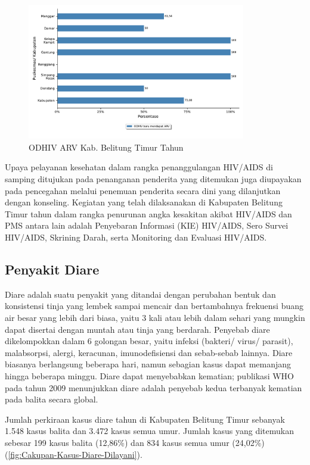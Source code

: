 \begin{figure}[H]
  \centering
  \includegraphics[width=0.85\textwidth]{bab_06/bab_06_03b_ARV}
  \caption{ODHIV ARV Kab. Belitung Timur Tahun \tP}
  \label{fig:HIV-ARV}
\end{figure}

Upaya pelayanan kesehatan dalam rangka penanggulangan HIV/AIDS di samping ditujukan pada penanganan penderita yang ditemukan juga diupayakan pada pencegahan melalui penemuan penderita secara dini yang dilanjutkan dengan konseling.
Kegiatan yang telah dilaksanakan di Kabupaten Belitung Timur tahun \tP dalam rangka penurunan angka kesakitan akibat HIV/AIDS dan PMS antara lain adalah Penyebaran Informasi (KIE) HIV/AIDS, Sero Survei HIV/AIDS, Skrining Darah, serta Monitoring dan Evaluasi HIV/AIDS.

\subsection{Penyakit Diare}
Diare adalah suatu penyakit yang ditandai dengan perubahan bentuk dan konsistensi tinja yang lembek sampai mencair dan bertambahnya frekuensi buang air besar yang lebih dari biasa, yaitu 3 kali atau lebih dalam sehari yang mungkin dapat disertai dengan muntah atau tinja yang berdarah.
Penyebab diare dikelompokkan dalam 6 golongan besar, yaitu infeksi (bakteri/ virus/ parasit), malabsorpsi, alergi, keracunan, imunodefisiensi dan sebab-sebab lainnya. Diare biasanya berlangsung beberapa hari, namun sebagian kasus dapat memanjang hingga beberapa minggu.
Diare dapat menyebabkan kematian; publikasi WHO pada tahun 2009 menunjukkan diare adalah penyebab kedua terbanyak kematian pada balita secara global.

Jumlah perkiraan kasus diare tahun \tP di Kabupaten Belitung Timur sebanyak 1.548 kasus balita dan 3.472 kasus semua umur.
Jumlah kasus yang ditemukan sebesar 199 kasus balita (12,86\%) dan 834 kasus semua umur (24,02\%) (\autoref{fig:Cakupan-Kasus-Diare-Dilayani}).

